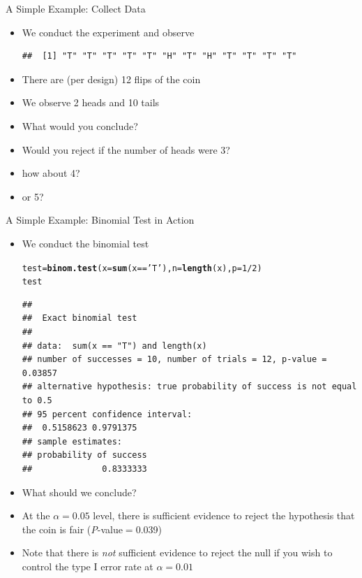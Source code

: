 \documentclass[xcolor=x11names,compress]{beamer}\usepackage[]{graphicx}\usepackage[]{color}
\makeatletter
\newcommand{\hlnum}[1]{\textcolor[rgb]{0.686,0.059,0.569}{#1}}%
\newcommand{\hlstr}[1]{\textcolor[rgb]{0.192,0.494,0.8}{#1}}%
\newcommand{\hlopt}[1]{\textcolor[rgb]{0,0,0}{#1}}%
\newcommand{\hlstd}[1]{\textcolor[rgb]{0.345,0.345,0.345}{#1}}%
\newcommand{\hlkwb}[1]{\textcolor[rgb]{0.69,0.353,0.396}{#1}}%
\newcommand{\hlkwc}[1]{\textcolor[rgb]{0.333,0.667,0.333}{#1}}%
\newcommand{\hlkwd}[1]{\textcolor[rgb]{0.737,0.353,0.396}{\textbf{#1}}}%
\newenvironment{kframe}{%
 \def\at@end@of@kframe{}%
 \ifinner\ifhmode%
  \def\at@end@of@kframe{\end{minipage}}%
  \begin{minipage}{\columnwidth}%
 \fi\fi%
 \def\FrameCommand##1{\hskip\@totalleftmargin \hskip-\fboxsep
 \colorbox{shadecolor}{##1}\hskip-\fboxsep
     \hskip-\linewidth \hskip-\@totalleftmargin \hskip\columnwidth}%
 \MakeFramed {\advance\hsize-\width
   \@totalleftmargin\z@ \linewidth\hsize
   \@setminipage}}%
 {\par\unskip\endMakeFramed%
 \at@end@of@kframe}
\newenvironment{knitrout}{}{} %
\makeatother
\begin{document}
\begin{frame}[fragile]{A Simple Example: Collect Data}
  \begin{itemize}
  \item We conduct the experiment and observe
\begin{knitrout}\tiny
{}\color{fgcolor}\begin{kframe}
\begin{verbatim}
##  [1] "T" "T" "T" "T" "T" "H" "T" "H" "T" "T" "T" "T"
\end{verbatim}
\end{kframe}
\end{knitrout}
\item There are (per design) 12 flips of the coin
\item We observe 2 heads and 10 tails
\item What would you conclude?
\item Would you reject if the number of heads were 3?
\item how about 4?
\item or 5?
  \end{itemize}
\end{frame}

\begin{frame}[fragile]{A Simple Example: Binomial Test in Action}
  \begin{itemize}    
  \item We conduct the  binomial test
\begin{knitrout}\tiny
{}\color{fgcolor}\begin{kframe}
\begin{alltt}
\hlstd{test}\hlkwb{=}\hlkwd{binom.test}\hlstd{(}\hlkwc{x}\hlstd{=}\hlkwd{sum}\hlstd{(x}\hlopt{==}\hlstr{'T'}\hlstd{),}\hlkwc{n}\hlstd{=}\hlkwd{length}\hlstd{(x),}\hlkwc{p}\hlstd{=}\hlnum{1}\hlopt{/}\hlnum{2}\hlstd{)}
\hlstd{test}
\end{alltt}
\begin{verbatim}
## 
## 	Exact binomial test
## 
## data:  sum(x == "T") and length(x)
## number of successes = 10, number of trials = 12, p-value = 0.03857
## alternative hypothesis: true probability of success is not equal to 0.5
## 95 percent confidence interval:
##  0.5158623 0.9791375
## sample estimates:
## probability of success 
##              0.8333333
\end{verbatim}
\end{kframe}
\end{knitrout}
\item What should we conclude?
\item At the $\alpha=0.05$ level, there is sufficient evidence to reject
      the hypothesis that the coin is fair 
      ({\it P}-value$=$0.039)
\item Note that there is {\it not} sufficient evidence to reject the null
      if you wish to control the type I error rate at $\alpha=0.01$ 
  \end{itemize}
\end{frame}
\end{document}
